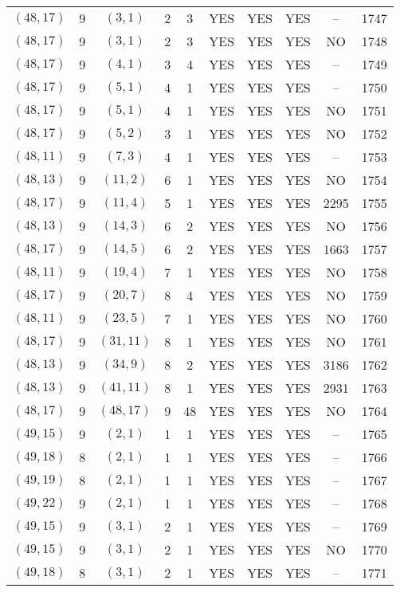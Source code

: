 \begin{longtable}{|c|c|c|c|c|c|c|c|c|c|}
$(48, 17)$ & 9 & $(3, 1)$ & 2 & 3 & YES & YES & YES & -- & 1747\\
$(48, 17)$ & 9 & $(3, 1)$ & 2 & 3 & YES & YES & YES & NO & 1748\\
$(48, 17)$ & 9 & $(4, 1)$ & 3 & 4 & YES & YES & YES & -- & 1749\\
$(48, 17)$ & 9 & $(5, 1)$ & 4 & 1 & YES & YES & YES & -- & 1750\\
$(48, 17)$ & 9 & $(5, 1)$ & 4 & 1 & YES & YES & YES & NO & 1751\\
$(48, 17)$ & 9 & $(5, 2)$ & 3 & 1 & YES & YES & YES & NO & 1752\\
$(48, 11)$ & 9 & $(7, 3)$ & 4 & 1 & YES & YES & YES & -- & 1753\\
$(48, 13)$ & 9 & $(11, 2)$ & 6 & 1 & YES & YES & YES & NO & 1754\\
$(48, 17)$ & 9 & $(11, 4)$ & 5 & 1 & YES & YES & YES & 2295 & 1755\\
$(48, 13)$ & 9 & $(14, 3)$ & 6 & 2 & YES & YES & YES & NO & 1756\\
$(48, 17)$ & 9 & $(14, 5)$ & 6 & 2 & YES & YES & YES & 1663 & 1757\\
$(48, 11)$ & 9 & $(19, 4)$ & 7 & 1 & YES & YES & YES & NO & 1758\\
$(48, 17)$ & 9 & $(20, 7)$ & 8 & 4 & YES & YES & YES & NO & 1759\\
$(48, 11)$ & 9 & $(23, 5)$ & 7 & 1 & YES & YES & YES & NO & 1760\\
$(48, 17)$ & 9 & $(31, 11)$ & 8 & 1 & YES & YES & YES & NO & 1761\\
$(48, 13)$ & 9 & $(34, 9)$ & 8 & 2 & YES & YES & YES & 3186 & 1762\\
$(48, 13)$ & 9 & $(41, 11)$ & 8 & 1 & YES & YES & YES & 2931 & 1763\\
$(48, 17)$ & 9 & $(48, 17)$ & 9 & 48 & YES & YES & YES & NO & 1764\\
$(49, 15)$ & 9 & $(2, 1)$ & 1 & 1 & YES & YES & YES & -- & 1765\\
$(49, 18)$ & 8 & $(2, 1)$ & 1 & 1 & YES & YES & YES & -- & 1766\\
$(49, 19)$ & 8 & $(2, 1)$ & 1 & 1 & YES & YES & YES & -- & 1767\\
$(49, 22)$ & 9 & $(2, 1)$ & 1 & 1 & YES & YES & YES & -- & 1768\\
$(49, 15)$ & 9 & $(3, 1)$ & 2 & 1 & YES & YES & YES & -- & 1769\\
$(49, 15)$ & 9 & $(3, 1)$ & 2 & 1 & YES & YES & YES & NO & 1770\\
$(49, 18)$ & 8 & $(3, 1)$ & 2 & 1 & YES & YES & YES & -- & 1771\\

\end{longtable}
